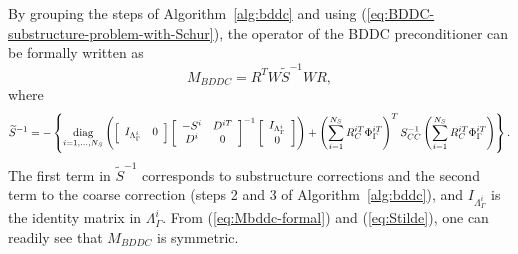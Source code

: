 By grouping the steps of Algorithm~\ref{alg:bddc} and using (\ref{eq:BDDC-substructure-problem-with-Schur}), 
the operator of the BDDC preconditioner can be formally written as
\begin{equation}
\label{eq:Mbddc-formal}
M_{BDDC}           = R^{T} W \widetilde{S}^{-1} WR,
\end{equation}
where
\begin{equation}
\label{eq:Stilde}
\widetilde{S}^{-1} = 
-\left\{ 
\underset{\scriptsize i = 1,\dots,N_S}{\mbox{diag}}
\left(
\left[
\begin{array}
[c]{cc}%
I_{{\Lambda}_{\Gamma}^{i}} & 0 
\end{array}
\right]  
\left[
\begin{array}
[c]{cc}%
-S^{i} & D^{iT}\\
D^{i} & 0
\end{array}
\right]^{-1} 
\left[
\begin{array}
[c]{c}%
I_{{\Lambda}_{\Gamma}^{i}} \\ 
0 
\end{array}
\right]  
\right) 
 +
\left(
\sum_{i=1}^{N_{S}}R_{C}^{iT}\Phi_{\Gamma}^{iT} 
\right)^T
S_{CC}^{-1}
\left(
\sum_{i=1}^{N_{S}}R_{C}^{iT}\Phi_{\Gamma}^{iT}
\right)
\right\}.
\end{equation}
The first term in $\widetilde{S}^{-1}$ corresponds to substructure corrections and the second term to the coarse correction
(steps 2 and 3 of Algorithm~\ref{alg:bddc}), 
and $I_{{\Lambda}_{\Gamma}^{i}}$ is the identity matrix in ${\Lambda}_{\Gamma}^{i}$.
From (\ref{eq:Mbddc-formal}) and (\ref{eq:Stilde}), one can readily see that $M_{BDDC}$ is symmetric.



